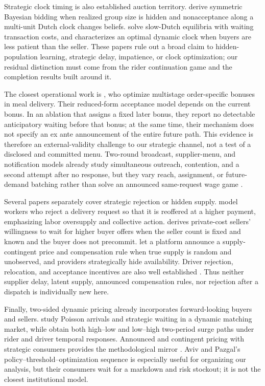 \documentclass[mnsc,dblanonrev]{informs4}
\begin{document}
Strategic clock timing is also established auction territory.
\citet{BuchananEtAl2016} derive symmetric Bayesian bidding when realized group
size is hidden and nonacceptance along a multi-unit Dutch clock changes beliefs.
\citet{CarareRothkopf2005} solve slow-Dutch equilibria with waiting transaction
costs, and \citet{Shneyerov2014} characterizes an optimal dynamic clock when
buyers are less patient than the seller.  These papers rule out a broad claim
to hidden-population learning, strategic delay, impatience, or clock
optimization; our residual distinction must come from the rider continuation
game and the completion results built around it.

The closest operational work is \citet{WuEtAl2022}, who optimize multistage
order-specific bonuses in meal delivery.  Their reduced-form acceptance model
depends on the current bonus.  In an ablation that assigns a fixed later bonus,
they report no detectable anticipatory waiting before that bonus; at the same
time, their mechanism does not specify an ex ante announcement of the entire
future path.  This evidence is therefore an external-validity challenge to our
strategic channel, not a test of a disclosed and committed menu.  Two-round
broadcast, supplier-menu, and notification models already study simultaneous
outreach, contention, and a second attempt after no response, but they vary
reach, assignment, or future-demand batching rather than solve an announced
same-request wage game \citep{SunEtAl2020,HornerEtAl2021,AusseilEtAl2022,
FengEtAl2023,QinEtAl2025}.

Several papers separately cover strategic rejection or hidden supply.
\citet{SiggEtAl2025} model workers who reject a delivery request so that it is
reoffered at a higher payment, emphasizing labor oversupply and collective
action.  \citet{Chen2012} derives private-cost sellers' willingness to wait
for higher buyer offers when the seller count is fixed and known and the buyer
does not precommit.  \citet{BaiEtAl2023} let a platform announce a
supply-contingent price and compensation rule when true supply is random and
unobserved, and providers strategically hide availability.  Driver rejection,
relocation, and acceptance incentives are also well established
\citep{GudaSubramanian2019,GargNazerzadeh2022,AfecheEtAl2023,
FengWang2023,MeskarEtAl2023}.  Thus neither supplier delay, latent supply,
announced compensation rules, nor rejection after a dispatch is individually
new here.

Finally, two-sided dynamic pricing already incorporates forward-looking buyers
and sellers.  \citet{ChenHu2020} study Poisson arrivals and strategic waiting
in a dynamic matching market, while \citet{HuHuZhu2022} obtain both high--low
and low--high two-period surge paths under rider and driver temporal responses.
Announced and contingent pricing with strategic consumers provides the
methodological mirror \citep{AvivPazgal2008,CorreaEtAl2016}.  Aviv and Pazgal's
policy--threshold--optimization sequence is especially useful for organizing
our analysis, but their consumers wait for a markdown and risk stockout; it is
not the closest institutional model.
\end{document}

